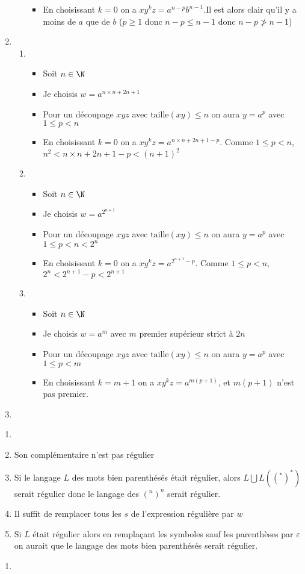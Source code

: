 \begin{enumerate}
\begin{enumerate}
\begin{itemize}
			\item En choisissant $k=0$ on a $xy^kz = a^{n-p}b^{n-1}$.Il est alors clair qu'il y a moins de $a$ que de $b$ ($p \geq 1$ donc $n-p\leq n-1$ donc $n-p\not>n-1$)
		\end{itemize}
	\end{enumerate}
	\item 
	\begin{enumerate}
		\item 
		\begin{itemize}
			\item Soit $n \in \N$
			\item Je choisis $w=a^{n\times n +2n +1}$
			\item Pour un découpage $xyz$ avec $\mathrm{taille}(xy) \leq n$ on aura $y=a^p$ avec $1\leq p<n$
			\item En choisissant $k=0$ on a $xy^kz = a^{n\times n +2n +1-p}$. Comme $1\leq p<n$, $n^2 < n\times n +2n +1-p < (n+1)^2$
		\end{itemize}
		\item 
		\begin{itemize}
			\item Soit $n \in \N$
			\item Je choisis $w=a^{2^{n+1}}$
			\item Pour un découpage $xyz$ avec $\mathrm{taille}(xy) \leq n$ on aura $y=a^p$ avec $1\leq p<n<2^n$
			\item En choisissant $k=0$ on a $xy^kz = a^{2^{n+1}-p}$. Comme $1\leq p<n$, $2^n < 2^{n+1}-p < 2^{n+1}$
		\end{itemize}
		\item 
		\begin{itemize}
			\item Soit $n \in \N$
			\item Je choisis $w=a^m$ avec $m$ premier supérieur strict à $2n$
			\item Pour un découpage $xyz$ avec $\mathrm{taille}(xy) \leq n$ on aura $y=a^p$ avec $1\leq p<m$
			\item En choisissant $k=m+1$ on a $xy^kz = a^{m(p+1)}$, et $m(p+1)$ n'est pas premier.
		\end{itemize}
	\end{enumerate}
	\item 
\end{enumerate}

\begin{enumerate}
	\item 
	\item Son complémentaire n'est pas régulier
	\item Si le langage $L$ des mots bien parenthésés était régulier, alors $L\bigcup L((^*)^*)$ serait régulier donc le langage des $(^n)^n$ serait régulier.
	\item Il suffit de remplacer tous les $s$ de l'expression régulière par $w$
	\item Si $L$ était régulier alors en remplaçant les symboles sauf les parenthèses par $\varepsilon$ on aurait que le langage des mots bien parenthésés serait régulier.
\end{enumerate}

\begin{enumerate}
	\item 
\end{enumerate}

